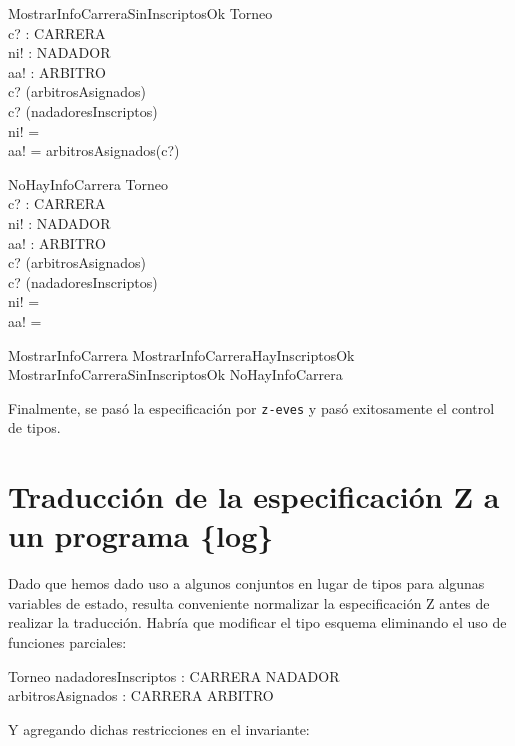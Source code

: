 \documentclass{article}
\begin{document}
\begin{schema}{MostrarInfoCarreraSinInscriptosOk}
\Xi Torneo \\
c? : CARRERA \\
ni! : \power NADADOR \\
aa! : \power ARBITRO \\
\where
c? \in \dom(arbitrosAsignados) \\
c? \notin \dom(nadadoresInscriptos) \\
ni! = \emptyset \\
aa! = arbitrosAsignados(c?)
\end{schema}

\begin{schema}{NoHayInfoCarrera}
\Xi Torneo \\
c? : CARRERA \\
ni! : \power NADADOR \\
aa! : \power ARBITRO \\
\where
c? \notin \dom(arbitrosAsignados) \\
c? \notin \dom(nadadoresInscriptos) \\
ni! = \emptyset \\
aa! = \emptyset
\end{schema}

\begin{zed}
MostrarInfoCarrera  MostrarInfoCarreraHayInscriptosOk \lor MostrarInfoCarreraSinInscriptosOk \lor NoHayInfoCarrera
\end{zed}

Finalmente, se pasó la especificación por \verb|z-eves| y pasó exitosamente el
control de tipos. 

\section*{Traducción de la especificación Z a un programa \{log\}}

Dado que hemos dado uso a algunos conjuntos en lugar de tipos para algunas
variables de estado, resulta conveniente normalizar la especificación Z
antes de realizar la traducción. Habría que modificar el tipo esquema 
eliminando el uso de funciones parciales:

\begin{schema}{Torneo}
nadadoresInscriptos : CARRERA \rel \power NADADOR \\
arbitrosAsignados : CARRERA \rel \power ARBITRO
\end{schema}

Y agregando dichas restricciones en el invariante:
\end{document}
